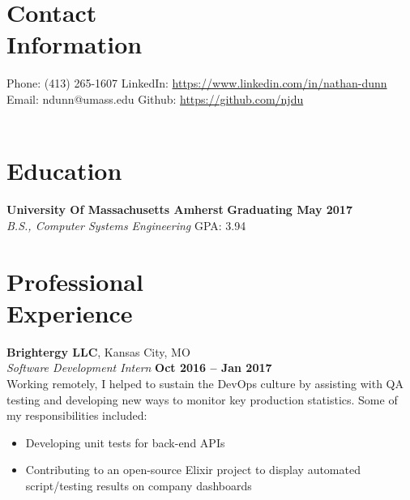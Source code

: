 \documentclass[margin,line]{resume}
\begin{document}
\begin{resume}
    \section{\mysidestyle Contact\\Information}

    Phone: (413) 265-1607 \tabto{5cm} LinkedIn: \url{https://www.linkedin.com/in/nathan-dunn}\\
    Email: ndunn@umass.edu \tabto{5cm}  Github: \url{https://github.com/njdu}\\
    \vspace{0mm}\\\vspace{-1cm}

    \section{\mysidestyle Education}

    \textbf{University Of Massachusetts Amherst} \hfill \textbf{Graduating May 2017}\\
    \textsl{B.S., Computer Systems Engineering} \hfill
    GPA: 3.94


    \section{\mysidestyle Professional\\Experience}

    \textbf{Brightergy LLC}, Kansas City, MO \vspace{2mm}\\\vspace{1mm}%
    \textsl{Software Development Intern} \hfill \textbf{Oct 2016 -- Jan 2017}\\
    Working remotely, I helped to sustain the DevOps culture by assisting with QA testing and developing new ways to monitor key production statistics.  Some of my responsibilities included:
    \begin{itemize}
        \item Developing unit tests for back-end APIs
        \item Contributing to an open-source Elixir project to display automated script/testing results on company dashboards
    \end{itemize}


\end{resume}
\end{document}
